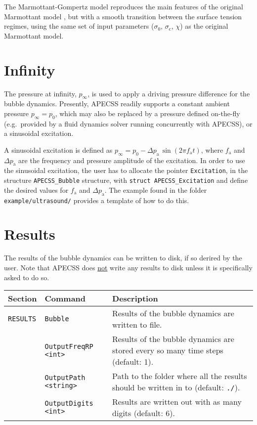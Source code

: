 The Marmottant-Gompertz model reproduces the main features of the original Marmottant model \citep{Guemmer2021}, but with a smooth transition between the surface tension regimes, using the same set of input parameters ($\sigma_0$, $\sigma_\text{c}$, $\chi$) as the original Marmottant model.

\section{Infinity}
\label{sec:infinity}

The pressure at infinity, $p_\infty$, is used to apply a driving pressure difference for the bubble dynamics. Presently, APECSS readily supports a constant ambient pressure $p_\infty = p_0$, which may also be replaced by a pressure defined on-the-fly (e.g.~provided by a fluid dynamics solver running concurrently with APECSS), or a sinusoidal excitation. 

A sinusoidal excitation is defined as $p_\infty = p_0 - \Delta p_\mathrm{a} \, \sin(2 \pi f_\mathrm{a} t)$, where $f_\mathrm{a}$ and $\Delta p_\mathrm{a}$ are the frequency and pressure amplitude of the excitation. In order to use the sinusoidal excitation, the user has to allocate the pointer {\tt *Excitation}, in the structure {\tt APECSS\_Bubble} structure, with {\tt struct APECSS\_Excitation} and define the desired values for  $f_\mathrm{a}$ and $\Delta p_\mathrm{a}$. The example found in the folder {\tt example/ultrasound/} provides a template of how to do this.

\section{Results}
\label{sec:bubbleresults}

The results of the bubble dynamics can be written to disk, if so derired by the user. Note that APECSS does \uline{not} write any results to disk unless it is specifically asked to do so.

\vspace{0.8em}

\noindent
\begin{tabular}{p{} p{} p{}}
    \textbf{Section} &\textbf{Command} & \textbf{Description} 
\vspace{1mm} \\ \hline
{\tt RESULTS} & {\tt Bubble} & Results of the bubble dynamics are written to file.\\ 
& {\tt OutputFreqRP <int>} & Results of the bubble dynamics are stored every so many time steps (default: 1).\\ 
& {\tt OutputPath <string>} & Path to the folder where all the results should be written in to (default: {\tt ./}).\\
& {\tt OutputDigits <int>} & Results are written out with as many digits (default: 6).\\
 \hline
\end{tabular} \vspace{1em}

